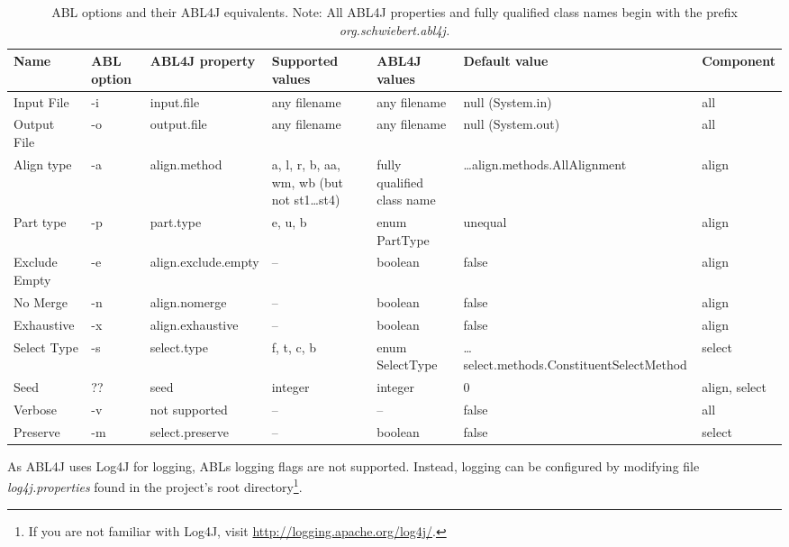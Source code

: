 \documentclass[12pt,a4paper]{article}
\newcommand{\link}[1]{\href{#1}{#1}}
\begin{document}
\begin{landscape}


\begin{table}
\label{abl_cmd_line}

\begin{tabular}[h]{|p{3.2cm}|p{1.5cm}|p{3.5cm}|p{3cm}|p{3cm}|p{3.2cm}|p{2.5cm}|}
\hline 
Name & ABL option & ABL4J property & Supported values & ABL4J values & Default
value & Component\\ \hline Input File & -i & input.file & any filename &
any filename & null (System.in) & all\\ \hline 
Output File & -o & output.file & any filename & any filename & null
(System.out) &all\\ \hline Align type & -a &
align.method & a, l, r, b, aa, wm, wb (but not st1\ldots st4) & fully qualified
class name & \ldots align.methods.\newline AllAlignment & align\\ \hline Part
type & -p & part.type & e, u, b & enum PartType & unequal &align\\ \hline Exclude Empty & -e &
align.exclude.empty & -- & boolean &false &align\\ \hline No Merge & -n &
align.nomerge & -- & boolean &false &align\\ \hline Exhaustive & -x &
align.exhaustive & -- & boolean &false &align\\ \hline Select Type & -s
&select.type & f, t, c, b &enum SelectType &\ldots
select.methods.\newline ConstituentSelect\newline Method &select\\ \hline Seed
& ?? &seed & integer & integer &0 &align, select\\ \hline Verbose & -v & not supported & -- & -- &false & all\\ \hline Preserve& -m &select.preserve & -- &
boolean & false &select\\ \hline

\end{tabular}
\caption{ABL options and their ABL4J equivalents. Note: All ABL4J properties
and fully qualified class names begin with the prefix
\emph{org.schwiebert.abl4j.}}
\end{table}
\end{landscape}


As ABL4J uses Log4J for logging, ABLs logging flags are not supported. Instead,
logging can be configured by modifying file \emph{log4j.properties} found in
the project's root directory\footnote{If you are not familiar with Log4J, visit
\link{http://logging.apache.org/log4j/}.}.
\end{document}
